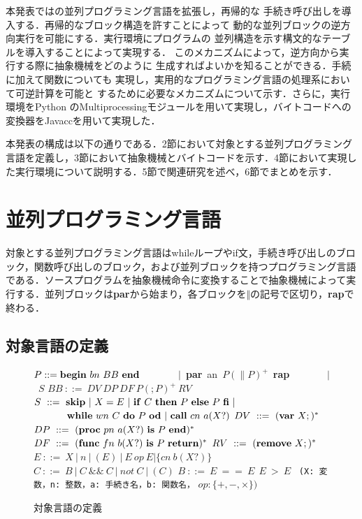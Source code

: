 \documentclass[submit,PRO]{ipsj}
\def\|{\verb|}
\begin{document}
本発表では\cite{DBLP:conf/rc/IkedaY20}の並列プログラミング言語を拡張し，再帰的な
手続き呼び出しを導入する．再帰的なブロック構造を許すことによって
動的な並列ブロックの逆方向実行を可能にする．実行環境にプログラムの
並列構造を示す構文的なテーブルを導入することによって実現する．
このメカニズムによって，逆方向から実行する際に抽象機械をどのように
生成すればよいかを知ることができる．手続に加えて関数についても
実現し，実用的なプログラミング言語の処理系において可逆計算を可能と
するために必要なメカニズムについて示す．さらに，実行環境をPython
のMultiprocessingモジュールを用いて実現し，バイトコードへの
変換器をJavaccを用いて実現した．

本発表の構成は以下の通りである．2節において対象とする並列プログラミング
言語を定義し，3節において抽象機械とバイトコードを示す．4節において実現し
た実行環境について説明する．5節で関連研究を述べ，6節でまとめを示す．

%3
\section{並列プログラミング言語}

対象とする並列プログラミング言語はwhileループやif文，手続き呼び出しのブロック，関数呼び出しのブロック，および並列ブロックを持つプログラミング言語である．ソースプログラムを抽象機械命令に変換することで抽象機械によって実行する．並列ブロックは{\bf par}から始まり，各ブロックを$\Vert$の記号で区切り，{\bf rap}で終わる．

%3.1
\subsection{対象言語の定義}
\label{sec:3.1}

\begin{figure}[tb]
\vbox{
\hbox{$P ::= {\bf begin}\ bn\ BB\ {\bf end}$}
\hbox{\ \ \ \ \ \ \ $\vert$ {\bf par} an $P(\parallel P)^+$ {\bf rap}}
\hbox{\ \ \ \ \ \ \ $\vert$ $S$}
\hbox{$BB\ ::=\ DV\ DP\ DF\ P(;P)^+\ RV$}
\hbox{$S\ ::=\ {\bf skip}\ \vert\  X = E\ \vert\ {\bf if}\ C\ {\bf then}\ P\ {\bf else}\ P\ {\bf fi}\ \vert$}
\hbox{$\ \ \ \ \ \ \ \ \ \  {\bf while}\ wn\ C\ {\bf do}\ P\ {\bf od}\ \vert\ {\bf call}\ cn\ a(X?)$}
\hbox{$DV\ ::=\ ({\bf var}\ X;)^*$}
\hbox{$DP\ ::=\ ({\bf proc}\ pn\ a(X?)\ {\bf is}\ P\ {\bf end})^*$}
\hbox{$DF\ ::=\ ({\bf func}\ fn\ b(X?)\ {\bf is}\ P\ {\bf return})^*$}
\hbox{$RV\ ::=\ ({\bf remove}\ X;)^*$}
\hbox{$E\ ::=\ X\ \vert\ n\ \vert\ (E)\ \vert\ E\ op\ E \vert \{cn\ b(X?)\}$}
\hbox{$C\ ::=\ B\ \vert\ C\ \&\& \ C\ \vert\ not\ C\ \vert\ (C)$}
\hbox{$B\ ::=\ E\ ==\ E\ \ E\ >\ E$}
\hbox{\\}
\hbox{\| (X: 変数，n: 整数，a: 手続き名，b: 関数名，|}
\hbox{$op: \{+,-,\times \})$}
}
\centerline{}
\caption{対象言語の定義}
\label{fig:def}
\end{figure}
\end{document}
